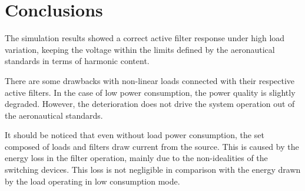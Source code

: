 \section{Conclusions}

The simulation results showed a correct active filter response under high load variation, keeping the voltage within the limits defined by the aeronautical standards in terms of harmonic content.

There are some drawbacks with non-linear loads connected with their respective active filters. In the case of low power consumption, the power quality is slightly degraded. However, the deterioration does not drive the system operation out of the aeronautical standards.

It should be noticed that even without load power consumption, the set composed of loads and filters draw current from the source. This is caused by the energy loss in the filter operation, mainly due to the non-idealities of the switching devices. This loss is not negligible in comparison with the energy drawn by the load operating in low consumption mode.

